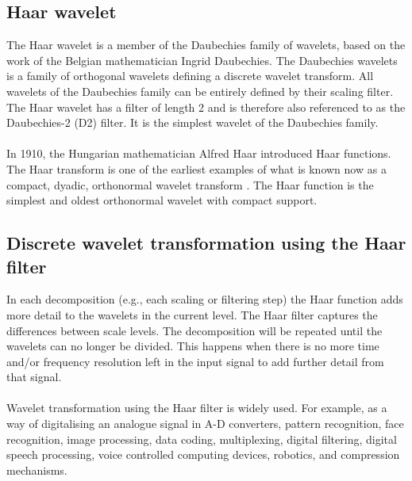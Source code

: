 \subsection{Haar wavelet}
The Haar wavelet is a member of the Daubechies family of wavelets, based on the
work of the Belgian mathematician Ingrid Daubechies. The Daubechies wavelets is
a family of orthogonal wavelets defining a discrete wavelet transform. All
wavelets of the Daubechies family can be entirely defined by their scaling
filter. The Haar wavelet has a filter of length 2 and is therefore also
referenced to as the Daubechies-2 (D2) filter. It is the simplest wavelet of
the Daubechies family.

\paragraph{}
In 1910, the Hungarian mathematician Alfred Haar introduced Haar functions. The
Haar transform is one of the earliest examples of what is known now as a
compact, dyadic, orthonormal wavelet transform \cite{stankovic}. The Haar
function is the simplest and oldest orthonormal wavelet with compact support.

\subsection{Discrete wavelet transformation using the Haar filter}
In each decomposition (e.g., each scaling or filtering step) the Haar function
adds more detail to the wavelets in the current level. The Haar filter captures
the differences between scale levels. The decomposition will be repeated until
the wavelets can no longer be divided. This happens when there is no more time
and/or frequency resolution left in the input signal to add further detail from
that signal.

\paragraph{}
Wavelet transformation using the Haar filter is widely used. For example, as a
way of digitalising an analogue signal in A-D converters, pattern recognition,
face recognition, image processing, data coding, multiplexing, digital
filtering, digital speech processing, voice controlled computing devices,
robotics, and compression mechanisms.

